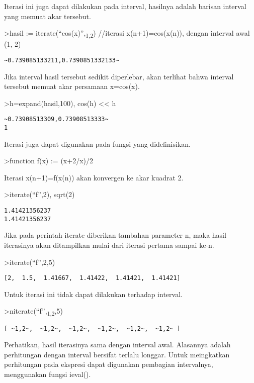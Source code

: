\documentclass[
]{book}
\begin{document}
Iterasi ini juga dapat dilakukan pada interval, hasilnya adalah barisan interval yang memuat akar tersebut.

\textgreater hasil := iterate(``cos(x)'',\textsubscript{1,2}) //iterasi x(n+1)=cos(x(n)), dengan interval awal (1, 2)

\begin{verbatim}
~0.739085133211,0.7390851332133~
\end{verbatim}

Jika interval hasil tersebut sedikit diperlebar, akan terlihat bahwa interval tersebut memuat akar persamaan x=cos(x).

\textgreater h=expand(hasil,100), cos(h) \textless\textless{} h

\begin{verbatim}
~0.73908513309,0.73908513333~
1
\end{verbatim}

Iterasi juga dapat digunakan pada fungsi yang didefinisikan.

\textgreater function f(x) := (x+2/x)/2

Iterasi x(n+1)=f(x(n)) akan konvergen ke akar kuadrat 2.

\textgreater iterate(``f'',2), sqrt(2)

\begin{verbatim}
1.41421356237
1.41421356237
\end{verbatim}

Jika pada perintah iterate diberikan tambahan parameter n, maka hasil iterasinya akan ditampilkan mulai dari iterasi pertama sampai ke-n.

\textgreater iterate(``f'',2,5)

\begin{verbatim}
[2,  1.5,  1.41667,  1.41422,  1.41421,  1.41421]
\end{verbatim}

Untuk iterasi ini tidak dapat dilakukan terhadap interval.

\textgreater niterate(``f'',\textsubscript{1,2},5)

\begin{verbatim}
[ ~1,2~,  ~1,2~,  ~1,2~,  ~1,2~,  ~1,2~,  ~1,2~ ]
\end{verbatim}

Perhatikan, hasil iterasinya sama dengan interval awal. Alasannya adalah perhitungan dengan interval bersifat terlalu longgar. Untuk meingkatkan perhitungan pada ekspresi dapat digunakan pembagian intervalnya, menggunakan fungsi ieval().
\end{document}
